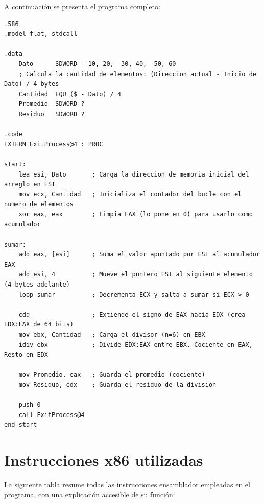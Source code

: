 \documentclass[12pt, letterpaper]{article}
\begin{document}
A continuación se presenta el programa completo:

\begin{lstlisting}[language=MASM, caption={promedio.asm --- Promedio de enteros con signo}]
.586
.model flat, stdcall

.data
    Dato      SDWORD  -10, 20, -30, 40, -50, 60
    ; Calcula la cantidad de elementos: (Direccion actual - Inicio de Dato) / 4 bytes
    Cantidad  EQU ($ - Dato) / 4
    Promedio  SDWORD ?
    Residuo   SDWORD ?

.code
EXTERN ExitProcess@4 : PROC

start:
    lea esi, Dato       ; Carga la direccion de memoria inicial del arreglo en ESI
    mov ecx, Cantidad   ; Inicializa el contador del bucle con el numero de elementos
    xor eax, eax        ; Limpia EAX (lo pone en 0) para usarlo como acumulador

sumar:
    add eax, [esi]      ; Suma el valor apuntado por ESI al acumulador EAX
    add esi, 4          ; Mueve el puntero ESI al siguiente elemento (4 bytes adelante)
    loop sumar          ; Decrementa ECX y salta a sumar si ECX > 0

    cdq                 ; Extiende el signo de EAX hacia EDX (crea EDX:EAX de 64 bits)
    mov ebx, Cantidad   ; Carga el divisor (n=6) en EBX
    idiv ebx            ; Divide EDX:EAX entre EBX. Cociente en EAX, Resto en EDX

    mov Promedio, eax   ; Guarda el promedio (cociente)
    mov Residuo, edx    ; Guarda el residuo de la division

    push 0
    call ExitProcess@4
end start
\end{lstlisting}

\section{Instrucciones x86 utilizadas}

La siguiente tabla resume todas las instrucciones ensamblador empleadas en el programa, con una explicación accesible de su función:
\end{document}
